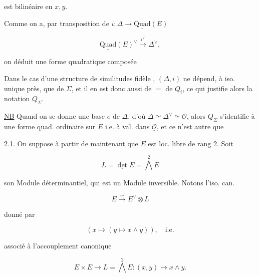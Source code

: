 
est bilinéaire en $x,y$. 

Comme on a, par transposition de $i:\Delta\longrightarrow\underline{\mathrm{Quad}}(E)$

\[\underline{\mathrm{Quad}}(E)^\vee\xrightarrow{i^\vee}\Delta^\vee,\]

on déduit une forme quadratique composée


Dans le cas d'une structure de similitudes fidèle \inserted{$\Sigma$}, $(\Delta,i)$ ne dépend, à iso.  unique près, que de $\Sigma$, et il en est donc aussi de $=$ de $Q_i$, ce qui justifie alors la notation $Q_\Sigma$. 

\uline{NB} Quand on se donne une base $e$ de $\Delta$, d'où $\Delta\simeq\Delta^\vee\simeq\underline{\mathcal O}$, alors $Q_\Sigma$ s'identifie à une forme quad. ordinaire sur $E$ i.e. à val. dans $\underline{\mathcal O}$, et ce n'est autre que  


2.1. On suppose à partir de maintenant que $E$ est loc. libre de rang 2. Soit

\[L=\underline{\det}E=\bigwedge^2 E\]

son Module déterminantiel, qui est un Module inversible. Notons l'iso. can.

\[E\xrightarrow{\sim} E^\vee\otimes L\]

donné par

\[(x\longmapsto(y\longmapsto x\wedge y)),\quad\text{i.e.}\]

associé à l'accouplement canonique

\[E\times E\longrightarrow L=\bigwedge^2 E:(x,y)\longmapsto x\wedge y.\]
